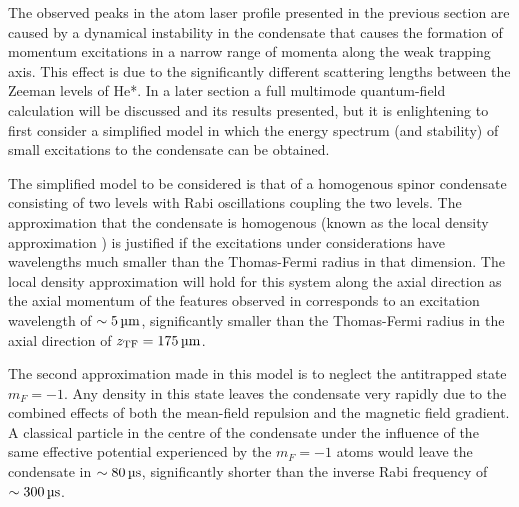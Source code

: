 The observed peaks in the atom laser profile presented in the previous section are caused by a dynamical instability in the condensate that causes the formation of momentum excitations in a narrow range of momenta along the weak trapping axis.
This effect is due to the significantly different scattering lengths between the Zeeman levels of He*. In a later section a full multimode quantum-field calculation will be discussed and its results presented, but it is enlightening to first consider a simplified model in which the energy spectrum (and stability) of small excitations to the condensate can be obtained.

The simplified model to be considered is that of a homogenous spinor condensate consisting of two levels with Rabi oscillations coupling the two levels. The approximation that the condensate is homogenous (known as the local density approximation \cite{Stamper-Kurn:1999,Zambelli:2000}) is justified if the excitations under considerations have wavelengths much smaller than the Thomas-Fermi radius in that dimension. The local density approximation will hold for this system along the axial direction as the axial momentum of the features observed in  corresponds to an excitation wavelength of $\sim \unit[5]{\micro m}$, significantly smaller than the Thomas-Fermi radius in the axial direction of $z_\text{TF} = \unit[175]{\micro m}$. 

The second approximation made in this model is to neglect the antitrapped state $m_F=-1$. Any density in this state leaves the condensate very rapidly due to the combined effects of both the mean-field repulsion and the magnetic field gradient. A classical particle in the centre of the condensate under the influence of the same effective potential experienced by the $m_F=-1$ atoms would leave the condensate in $\sim \unit[80]{\micro s}$, significantly shorter than the inverse Rabi frequency of $\sim \unit[300]{\micro s}$.

